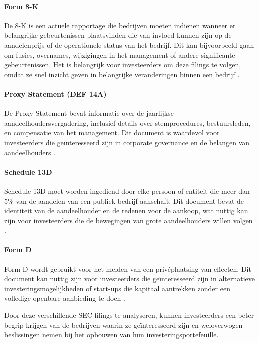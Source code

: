 \paragraph{Form 8-K}
De 8-K is een actuele rapportage die bedrijven moeten indienen wanneer er belangrijke gebeurtenissen plaatsvinden die van invloed kunnen zijn op de aandelenprijs of de operationele status van het bedrijf. Dit kan bijvoorbeeld gaan om fusies, overnames, wijzigingen in het management of andere significante gebeurtenissen. Het is belangrijk voor investeerders om deze filings te volgen, omdat ze snel inzicht geven in belangrijke veranderingen binnen een bedrijf  \autocite{SECfiling2024}\autocite{CFI2024} \autocite{Baker2022}.

\paragraph{Proxy Statement (DEF 14A)}
De Proxy Statement bevat informatie over de jaarlijkse aandeelhoudersvergadering, inclusief details over stemprocedures, bestuursleden, en compensatie van het management. Dit document is waardevol voor investeerders die geïnteresseerd zijn in corporate governance en de belangen van aandeelhouders  \autocite{SECfiling2024} \autocite{Baker2022}.

\paragraph{Schedule 13D}
Schedule 13D moet worden ingediend door elke persoon of entiteit die meer dan 5\% van de aandelen van een publiek bedrijf aanschaft. Dit document bevat de identiteit van de aandeelhouder en de redenen voor de aankoop, wat nuttig kan zijn voor investeerders die de bewegingen van grote aandeelhouders willen volgen \autocite{CFI2024} \autocite{Baker2022}.

\paragraph{Form D}
Form D wordt gebruikt voor het melden van een privéplaatsing van effecten. Dit document kan nuttig zijn voor investeerders die geïnteresseerd zijn in alternatieve investeringsmogelijkheden of start-ups die kapitaal aantrekken zonder een volledige openbare aanbieding te doen  \autocite{SECfiling2024}.

Door deze verschillende SEC-filings te analyseren, kunnen investeerders een beter begrip krijgen van de bedrijven waarin ze geïnteresseerd zijn en weloverwogen beslissingen nemen bij het opbouwen van hun investeringsportefeuille.

